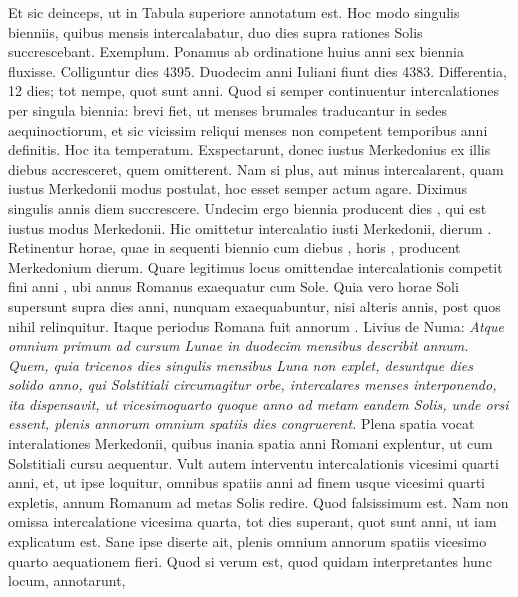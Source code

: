 Et sic deinceps, ut in Tabula superiore
annotatum est.
Hoc modo singulis bienniis, quibus mensis intercalabatur,
duo dies supra rationes Solis succrescebant.
Exemplum.
%
Ponamus ab ordinatione huius anni sex biennia fluxisse.
Colliguntur
dies 4395.
Duodecim anni Iuliani fiunt dies 4383.
Differentia, 12 dies; tot nempe, quot sunt anni.
Quod si semper
continuentur intercalationes per singula biennia: brevi fiet,
ut menses brumales traducantur in sedes aequinoctiorum, et sic
vicissim reliqui menses non competent temporibus anni definitis.
Hoc ita temperatum. Exspectarunt, donec iustus Merkedonius
ex illis diebus accresceret, quem omitterent.
Nam si
plus, aut minus intercalarent, quam iustus Merkedonii modus postulat,
hoc esset semper actum agare.
Diximus singulis annis diem
succrescere.
Undecim ergo biennia producent dies , qui est iustus
modus Merkedonii.
Hic omittetur intercalatio iusti Merkedonii,
dierum .
Retinentur  horae, quae in sequenti biennio cum
diebus , horis , producent Merkedonium  dierum.
Quare legitimus locus omittendae intercalationis competit fini anni
, ubi annus Romanus exaequatur cum Sole.
Quia vero  horae
Soli supersunt supra dies anni, nunquam exaequabuntur, nisi alteris
 annis, post quos nihil relinquitur.
Itaque periodus
Romana fuit annorum .
Livius de Numa: \textit{Atque omnium
primum ad cursum Lunae in duodecim mensibus describit annum.}
\textit{Quem,
quia tricenos dies singulis mensibus Luna non explet, desuntque dies
solido anno, qui Solstitiali circumagitur orbe,
 intercalares menses interponendo,
ita dispensavit, ut vicesimoquarto quoque anno ad metam
eandem Solis, unde orsi essent, plenis annorum omnium spatiis dies congruerent.}
Plena spatia vocat interalationes Merkedonii, quibus inania
spatia anni Romani explentur, ut cum Solstitiali cursu aequentur.
Vult autem interventu intercalationis vicesimi quarti anni, et, ut
ipse loquitur, omnibus spatiis anni ad finem usque vicesimi quarti
expletis, annum Romanum ad metas Solis redire.
Quod falsissimum
est.
Nam non omissa intercalatione vicesima quarta, tot dies
superant, quot sunt anni, ut iam explicatum est.
Sane ipse diserte ait,
plenis omnium annorum spatiis vicesimo quarto aequationem fieri.
Quod si verum est, quod quidam interpretantes hunc locum, annotarunt,
